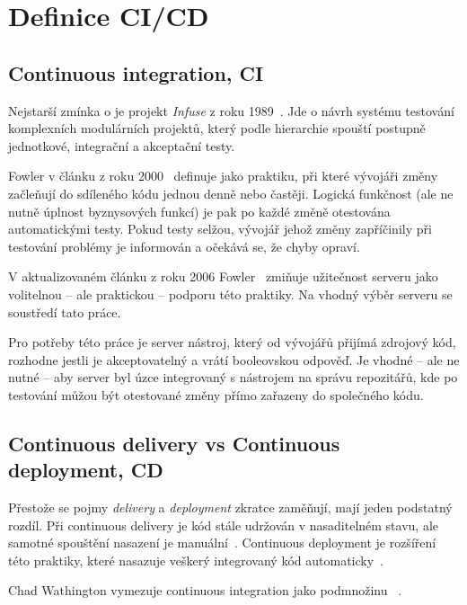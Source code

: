     \section*{Definice CI/CD}
        \subsection*{Continuous integration, CI}
            Nejstarší zmínka o \CI je projekt \textit{Infuse} z roku 1989~\cite{kaiser-infuse}. Jde o návrh systému testování komplexních modulárních projektů, který podle hierarchie spouští postupně jednotkové, integrační a akceptační testy.

            Fowler v článku z roku 2000~\cite{fowler-ci-original} definuje \CI jako praktiku, při které vývojáři změny začleňují do sdíleného kódu jednou denně nebo častěji. Logická funkčnost (ale ne nutně úplnost byznysových funkcí) je pak po každé změně otestována automatickými testy. Pokud testy selžou, vývojář jehož změny zapříčinily při testování problémy je informován a očekává se, že chyby opraví.

            V aktualizovaném článku z roku 2006 Fowler~\cite{fowler-ci} zmiňuje užitečnost \CI serveru jako volitelnou -- ale praktickou -- podporu této praktiky. Na vhodný výběr \CI serveru se soustředí tato práce.

            Pro potřeby této práce je \CI server nástroj, který od vývojářů přijímá zdrojový kód, rozhodne jestli je akceptovatelný a vrátí booleovskou odpověď. Je vhodné -- ale ne nutné -- aby \CI server byl úzce integrovaný s nástrojem na správu repozitářů, kde po testování můžou být otestované změny přímo zařazeny do společného kódu.

        \subsection*{Continuous delivery vs Continuous deployment, CD}
            Přestože se pojmy \textit{delivery} a \textit{deployment} zkratce \CD zaměňují, mají jeden podstatný rozdíl. Při continuous delivery je kód stále udržován v nasaditelném stavu, ale samotné spouštění nasazení je manuální~\cite{cd-delivery}. Continuous deployment je rozšíření této praktiky, které nasazuje veškerý integrovaný kód automaticky~\cite{cd-versus}.

            Chad Wathington vymezuje continuous integration jako podmnožinu \CD~\cite{fowler-go}.

